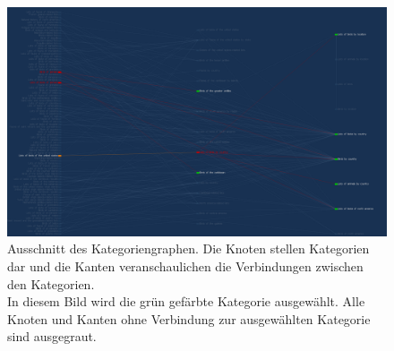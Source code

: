 \begin{figure}
    \centering
    \includegraphics[width=\textwidth]{images/01_introduction/category-view.png}
    \caption{Ausschnitt des Kategoriengraphen. Die Knoten stellen Kategorien dar und die Kanten veranschaulichen die Verbindungen zwischen den Kategorien.\\ In diesem Bild wird die grün gefärbte Kategorie ausgewählt. Alle Knoten und Kanten ohne Verbindung zur ausgewählten Kategorie sind ausgegraut.}
    \label{fig:category-view}
\end{figure}












